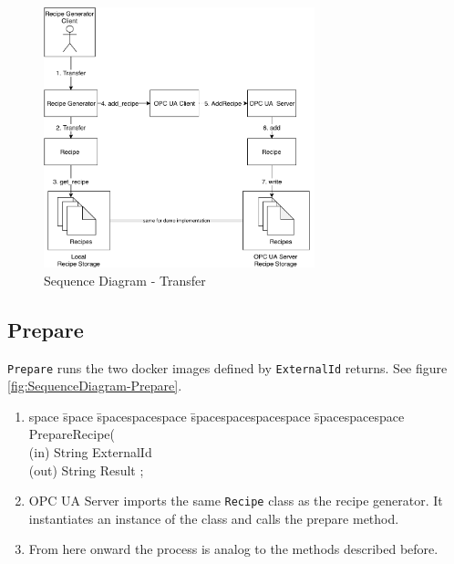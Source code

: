 \begin{figure}[ht]
	\centering
  \includegraphics[width=0.7\textwidth]{img/SequenceDiagram-Transfer.pdf}
	\caption{Sequence Diagram - Transfer}
	\label{fig:SequenceDiagram-Transfer}
\end{figure}

\subsection{Prepare}
\texttt{Prepare} runs the two docker images defined by \texttt{ExternalId} returns. See figure \ref{fig:SequenceDiagram-Prepare}.

\begin{enumerate}
    \item 
    \begin{tabbing}
    space \= space \= spacespacespace \= spacespacespacespace \= spacespacespace \kill
    \>  PrepareRecipe(\\
    \>  \>  (in)	 \> 	String          \> ExternalId\\
    \>  \>  (out)	 \> 	String          \> Result ; 
    \end{tabbing}
    \item OPC UA Server imports the same \texttt{Recipe} class as the recipe generator. It instantiates an instance of the class and calls the prepare method.
    \item From here onward the process is analog to the methods described before.
\end{enumerate}

